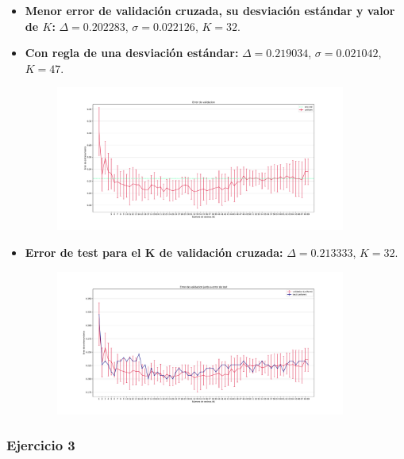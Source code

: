 \documentclass[11pt]{article}
\begin{document}
\begin{itemize}
    \item \textbf{Menor error de validación cruzada, su desviación estándar y valor de $K$:} $\Delta = 0.202283$, $\sigma = 0.022126$, $K = 32$.
    \item \textbf{Con regla de una desviación estándar:} $\Delta = 0.219034$, $\sigma = 0.021042$, $K = 47$.
    \begin{figure}[H]
    \centering
    \includegraphics[width=0.9\textwidth]{fotos/ej2_1.pdf}
    \end{figure}
    \item \textbf{Error de test para el K de validación cruzada:} $\Delta = 0.213333$, $K = 32$.
    \begin{figure}[H]
    \centering
    \includegraphics[width=0.9\textwidth]{fotos/ej2_2.pdf}
    \end{figure}
\end{itemize}


\subsubsection*{Ejercicio 3}
\end{document}
